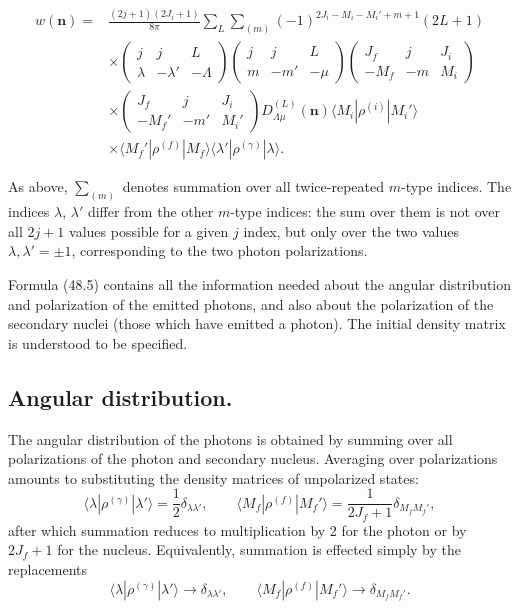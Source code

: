 \begin{equation}
\begin{split}
w(\mathbf n)={}&\frac{(2j+1)(2J_i+1)}{8\pi}
\sum_L\sum_{(m)}(-1)^{2J_i-M_i-M_i'+m+1}(2L+1)\\
&\times\begin{pmatrix}j&j&L\\\lambda&-\lambda'&-\Lambda\end{pmatrix}
\begin{pmatrix}j&j&L\\m&-m'&-\mu\end{pmatrix}
\begin{pmatrix}J_f&j&J_i\\-M_f&-m&M_i\end{pmatrix}\\
&\times\begin{pmatrix}J_f&j&J_i\\-M_f'&-m'&M_i'\end{pmatrix}
D_{\Lambda\mu}^{(L)}(\mathbf n)
\langle M_i|\rho^{(i)}|M_i'\rangle\\
&\times\langle M_f'|\rho^{(f)}|M_f\rangle
\langle\lambda'|\rho^{(\gamma)}|\lambda\rangle .
\end{split}
\tag{48.5}
\end{equation}

As above, $\sum_{(m)}$ denotes summation over all twice-repeated $m$-type indices. The indices $\lambda$, $\lambda'$ differ from the other $m$-type indices: the sum over them is not over all $2j+1$ values possible for a given $j$ index, but only over the two values $\lambda,\lambda'=\pm1$, corresponding to the two photon polarizations.

Formula (48.5) contains all the information needed about the angular distribution and polarization of the emitted photons, and also about the polarization of the secondary nuclei (those which have emitted a photon). The initial density matrix is understood to be specified.

\subsection*{Angular distribution.} The angular distribution of the photons is obtained by summing over all polarizations of the photon and secondary nucleus. Averaging over polarizations amounts to substituting the density matrices of unpolarized states:
\begin{equation}
\langle\lambda|\rho^{(\gamma)}|\lambda'\rangle=\frac12\delta_{\lambda\lambda'},
\qquad
\langle M_f|\rho^{(f)}|M_f'\rangle=\frac1{2J_f+1}\delta_{M_fM_f'},
\tag{48.6}
\end{equation}
after which summation reduces to multiplication by 2 for the photon or by $2J_f+1$ for the nucleus. Equivalently, summation is effected simply by the replacements
\begin{equation}
\langle\lambda|\rho^{(\gamma)}|\lambda'\rangle\to\delta_{\lambda\lambda'},
\qquad
\langle M_f|\rho^{(f)}|M_f'\rangle\to\delta_{M_fM_f'}.
\tag{48.7}
\end{equation}

